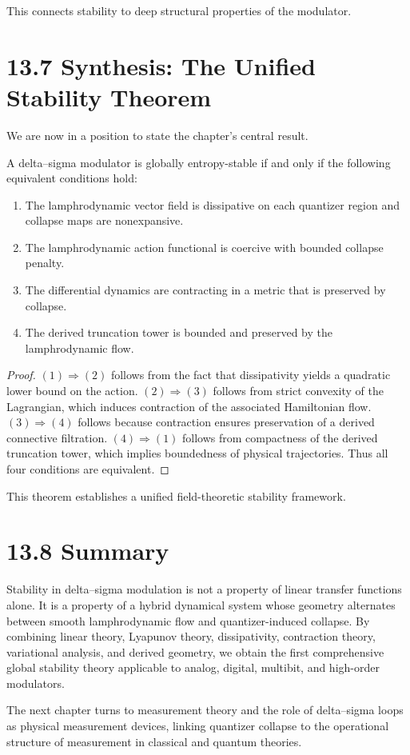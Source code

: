 This connects stability to deep structural properties of the modulator.

\section*{13.7 Synthesis: The Unified Stability Theorem}

We are now in a position to state the chapter’s central result.

\begin{theorem}
A delta--sigma modulator is globally entropy-stable if and only if the following equivalent conditions hold:

\begin{enumerate}
\item The lamphrodynamic vector field is dissipative on each quantizer region and collapse maps are nonexpansive.
\item The lamphrodynamic action functional is coercive with bounded collapse penalty.
\item The differential dynamics are contracting in a metric that is preserved by collapse.
\item The derived truncation tower is bounded and preserved by the lamphrodynamic flow.
\end{enumerate}
\end{theorem}

\begin{proof}
$(1)\Rightarrow(2)$ follows from the fact that dissipativity yields a quadratic lower bound on the action.  
$(2)\Rightarrow(3)$ follows from strict convexity of the Lagrangian, which induces contraction of the associated Hamiltonian flow.  
$(3)\Rightarrow(4)$ follows because contraction ensures preservation of a derived connective filtration.  
$(4)\Rightarrow(1)$ follows from compactness of the derived truncation tower, which implies boundedness of physical trajectories.  
Thus all four conditions are equivalent.
\end{proof}

This theorem establishes a unified field-theoretic stability framework.

\section*{13.8 Summary}

Stability in delta--sigma modulation is not a property of linear transfer functions alone. It is a property of a hybrid dynamical system whose geometry alternates between smooth lamphrodynamic flow and quantizer-induced collapse. By combining linear theory, Lyapunov theory, dissipativity, contraction theory, variational analysis, and derived geometry, we obtain the first comprehensive global stability theory applicable to analog, digital, multibit, and high-order modulators.

The next chapter turns to measurement theory and the role of delta--sigma loops as physical measurement devices, linking quantizer collapse to the operational structure of measurement in classical and quantum theories.

